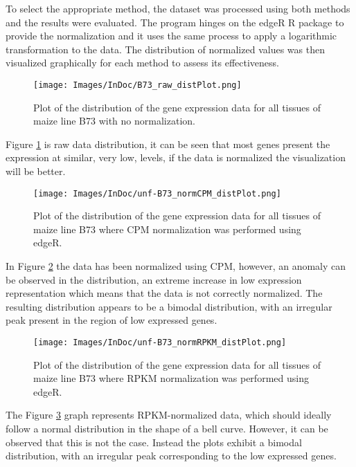 \documentclass[
]{article}
\begin{document}
To select the appropriate method, the dataset was processed using both
methods and the results were evaluated. The program hinges on the edgeR
R package to provide the normalization and it uses the same process to
apply a logarithmic transformation to the data. The distribution of
normalized values was then visualized graphically for each method to
assess its effectiveness.

\begin{figure}[H]
  \centering
  \texttt{[image: Images/InDoc/B73\_raw\_distPlot.png]}
  \caption[B73 raw distribution]{\small Plot of the distribution of the gene expression data for all tissues of maize line B73 with no normalization.}
    \label{fig:raw_Dist}
\end{figure}

Figure \ref{fig:raw_Dist} is raw data distribution, it can be seen that most genes
present the expression at similar, very low, levels, if the data is
normalized the visualization will be better.

\begin{figure}[H]
  \centering
  \texttt{[image: Images/InDoc/unf-B73\_normCPM\_distPlot.png]}
  \caption[B73 CPM distribution]{\small Plot of the distribution of the gene expression data for all tissues of maize line B73 where CPM normalization was performed using edgeR.}
    \label{fig:CPM_Dist}
\end{figure}

In Figure \ref{fig:CPM_Dist} the data has been normalized using CPM, however, an
anomaly can be observed in the distribution, an extreme increase in low
expression representation which means that the data is not correctly
normalized. The resulting distribution appears to be a bimodal
distribution, with an irregular peak present in the region of low
expressed genes.

\begin{figure}[H]
  \centering
  \texttt{[image: Images/InDoc/unf-B73\_normRPKM\_distPlot.png]}
  \caption[B73 RPKM distribution]{\small Plot of the distribution of the gene expression data for all tissues of maize line B73 where RPKM normalization was performed using edgeR.}
    \label{fig:RPKM_Dist}
\end{figure}

The Figure \ref{fig:RPKM_Dist} graph represents RPKM-normalized data, which should
ideally follow a normal distribution in the shape of a bell curve.
However, it can be observed that this is not the case. Instead the plots
exhibit a bimodal distribution, with an irregular peak corresponding to
the low expressed genes.
\end{document}

